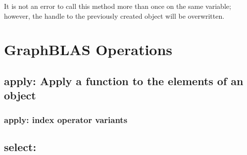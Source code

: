 It is not an error to call this method more than once on the same variable;  
however, the handle to the previously created object will be overwritten. 


\section{GraphBLAS Operations}


\subsection{{\sf apply}: Apply a function to the elements of an object}
\subsubsection{{\sf apply}: index operator variants}


\subsection{{\sf select}: }